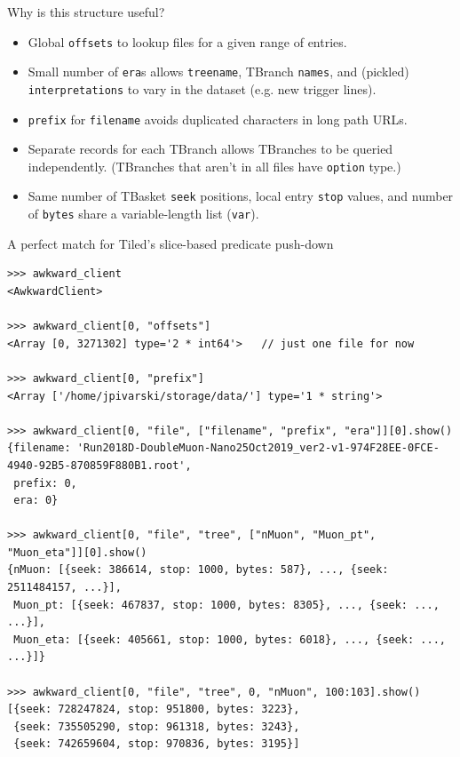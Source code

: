 \documentclass[aspectratio=169]{beamer}
\begin{document}
\begin{frame}{Why is this structure useful?}
\large
\vspace{0.5 cm}

\begin{itemize}\setlength{\itemsep}{0.5 cm}
\item Global \texttt{offsets} to lookup files for a given range of entries.
\item Small number of \texttt{era}s allows \texttt{treename}, TBranch \texttt{names}, and (pickled) \texttt{interpretations} to vary in the dataset (e.g. new trigger lines).
\item \texttt{prefix} for \texttt{filename} avoids duplicated characters in long path URLs.
\item Separate records for each TBranch allows TBranches to be queried independently. (TBranches that aren't in all files have \texttt{option} type.)
\item Same number of TBasket \texttt{seek} positions, local entry \texttt{stop} values, and number of \texttt{bytes} share a variable-length list (\texttt{var}).
\end{itemize}
\end{frame}

\begin{frame}[fragile]{A perfect match for Tiled's slice-based predicate push-down}
\vspace{0.2 cm}
\scriptsize
\begin{verbatim}
>>> awkward_client
<AwkwardClient>

>>> awkward_client[0, "offsets"]
<Array [0, 3271302] type='2 * int64'>   // just one file for now

>>> awkward_client[0, "prefix"]
<Array ['/home/jpivarski/storage/data/'] type='1 * string'>

>>> awkward_client[0, "file", ["filename", "prefix", "era"]][0].show()
{filename: 'Run2018D-DoubleMuon-Nano25Oct2019_ver2-v1-974F28EE-0FCE-4940-92B5-870859F880B1.root',
 prefix: 0,
 era: 0}

>>> awkward_client[0, "file", "tree", ["nMuon", "Muon_pt", "Muon_eta"]][0].show()
{nMuon: [{seek: 386614, stop: 1000, bytes: 587}, ..., {seek: 2511484157, ...}],
 Muon_pt: [{seek: 467837, stop: 1000, bytes: 8305}, ..., {seek: ..., ...}],
 Muon_eta: [{seek: 405661, stop: 1000, bytes: 6018}, ..., {seek: ..., ...}]}

>>> awkward_client[0, "file", "tree", 0, "nMuon", 100:103].show()
[{seek: 728247824, stop: 951800, bytes: 3223},
 {seek: 735505290, stop: 961318, bytes: 3243},
 {seek: 742659604, stop: 970836, bytes: 3195}]
\end{verbatim}
\end{frame}
\end{document}
